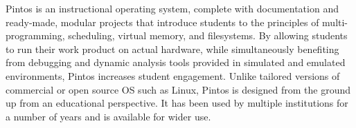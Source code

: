 Pintos is an instructional operating system, complete with documentation
and ready-made, modular projects that introduce students to
the principles of multi-programming, scheduling, virtual memory,
and filesystems.  By allowing students to run their work product on
actual hardware, while simultaneously benefiting from debugging
and dynamic analysis tools provided in simulated and emulated environments,
Pintos increases student engagement.  Unlike tailored versions of
commercial or open source OS such as Linux, Pintos is designed from the
ground up from an educational perspective.  
It has been used by multiple institutions for a number of years and
is available for wider use.
